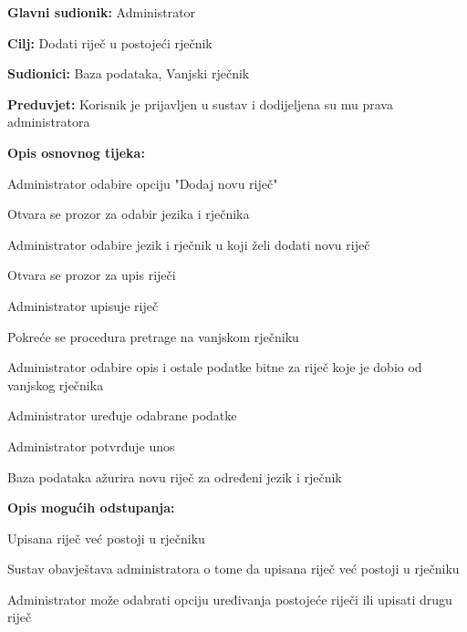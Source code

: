 					\noindent {}
					\begin{packed_item}
	
						\item \textbf{Glavni sudionik: }Administrator
						\item  \textbf{Cilj:} Dodati riječ u postojeći rječnik
						\item  \textbf{Sudionici:} Baza podataka, Vanjski rječnik
						\item  \textbf{Preduvjet:} Korisnik je prijavljen u sustav i dodijeljena su mu prava administratora
						\item  \textbf{Opis osnovnog tijeka:}
						
						\item[] \begin{packed_enum}
	
							\item Administrator odabire opciju "Dodaj novu riječ"
							\item Otvara se prozor za odabir jezika i rječnika
							\item Administrator odabire jezik i rječnik u koji želi dodati novu riječ
							\item Otvara se prozor za upis riječi
							\item Administrator upisuje riječ
							\item Pokreće se procedura pretrage na vanjskom rječniku
							\item Administrator odabire opis i ostale podatke bitne za riječ koje je dobio od vanjskog rječnika
							\item Administrator uređuje odabrane podatke
							\item Administrator potvrđuje unos
							\item Baza podataka ažurira novu riječ za određeni jezik i rječnik
					
						\end{packed_enum}

						\item  \textbf{Opis mogućih odstupanja:}
						
						\item[] \begin{packed_item}
	
							\item[5.a] Upisana riječ već postoji u rječniku
							\item[] \begin{packed_enum}
								
								\item Sustav obavještava administratora o tome da upisana riječ već postoji u rječniku
								\item Administrator može odabrati opciju uređivanja postojeće riječi ili upisati drugu riječ
								
							\end{packed_enum}
						\end{packed_item}
						
					\end{packed_item}

